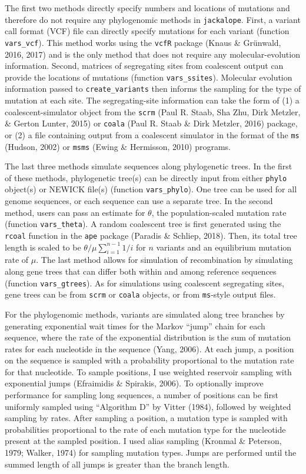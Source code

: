 \documentclass[12pt,]{article}
\begin{document}
The first two methods directly specify numbers and locations of mutations and
therefore do not require any phylogenomic methods in \texttt{jackalope}.
First, a variant call format (VCF) file can directly specify mutations for each
variant (function \texttt{vars\_vcf}).
This method works using the \texttt{vcfR} package (Knaus \& Grünwald, 2016, 2017) and
is the only method that does not require any molecular-evolution information.
Second, matrices of segregating sites from coalescent output can provide the locations
of mutations (function \texttt{vars\_ssites}).
Molecular evolution information passed to \texttt{create\_variants} then informs the sampling
for the type of mutation at each site.
The segregating-site information can take the form of
(1) a coalescent-simulator object from the \texttt{scrm} (Paul R. Staab, Sha Zhu, Dirk Metzler, \& Gerton Lunter, 2015) or
\texttt{coala} (Paul R. Staab \& Dirk Metzler, 2016) package, or
(2) a file containing output from a coalescent simulator in the format of the
\texttt{ms} (Hudson, 2002) or
\texttt{msms} (Ewing \& Hermisson, 2010) programs.

The last three methods simulate sequences along phylogenetic trees.
In the first of these methods,
phylogenetic tree(s) can be directly input from either \texttt{phylo} object(s) or
NEWICK file(s) (function \texttt{vars\_phylo}).
One tree can be used for all genome sequences, or each sequence can use a separate tree.
In the second method, users can pass an estimate for \(\theta\), the population-scaled
mutation rate (function \texttt{vars\_theta}).
A random coalescent tree is first generated using the \texttt{rcoal} function
in the \texttt{ape} package (Paradis \& Schliep, 2018).
Then, its total tree length is scaled to be
\(\theta / \mu \sum_{i=1}^{n-1}{1 / i}\) for \(n\) variants and an equilibrium
mutation rate of \(\mu\).
The last method allows for simulation of recombination by simulating along
gene trees that can differ both within and among reference sequences
(function \texttt{vars\_gtrees}).
As for simulations using coalescent segregating sites, gene trees can be
from \texttt{scrm} or \texttt{coala} objects, or from \texttt{ms}-style output files.

For the phylogenomic methods, variants are simulated along tree branches by
generating exponential wait times
for the Markov ``jump'' chain for each sequence,
where the rate of the exponential distribution is the sum of mutation rates for
each nucleotide in the sequence (Yang, 2006).
At each jump, a position on the sequence is sampled with a probability proportional to
the mutation rate for that nucleotide.
To sample positions, I use weighted reservoir sampling with
exponential jumps (Efraimidis \& Spirakis, 2006).
To optionally improve performance for sampling long sequences,
a number of positions can be first uniformly sampled using
``Algorithm D'' by Vitter (1984), followed by weighted
sampling by rates.
After sampling a position, a mutation type is sampled with probabilities
proportional to the rate of each mutation type for the nucleotide
present at the sampled position.
I used alias sampling
(Kronmal \& Peterson, 1979; Walker, 1974)
for sampling mutation types.
Jumps are performed until the summed length of all jumps is greater than the
branch length.
\end{document}
